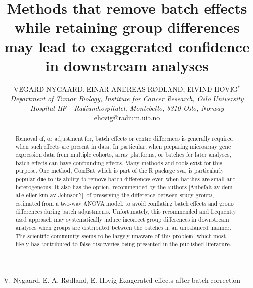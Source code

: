 \documentclass{bio}
\newcommand\NOTE[1]{{\color{red}[#1]}}
\begin{document}
\title{Methods that remove batch effects while retaining group differences may lead
to exaggerated confidence in downstream analyses
}

\author{VEGARD NYGAARD, EINAR ANDREAS RØDLAND, EIVIND HOVIG$^\ast$\\[4pt]
\textit{Department of Tumor Biology,
Institute for Cancer Research,
Oslo University Hospital HF - Radiumhospitalet,
Montebello,
0310 Oslo,
Norway}
\\[2pt]
{ehovig@radium.uio.no}}

\markboth%
{V. Nygaard, E. A. Rødland, E. Hovig}
{Exagerated effects after batch correction}


\maketitle


\begin{abstract}
{Removal of, or adjustment for, batch effects or centre differences is generally required when such effects are present in data. In particular, when preparing microarray gene expression data from multiple cohorts, array platforms, or batches for later analyses, batch effects can have confounding effects. Many methods and tools exist for this purpose. One method, ComBat which is part of the R package sva, is particularly popular due to its ability to remove batch differences even when batches are small and heterogeneous. It also has the option, recommended by the authors \NOTE{Anbefalt av dem alle eller kun av Johnson?}, of preserving the difference between study groups, estimated from a two-way ANOVA model, to avoid conflating batch effects and group differences during batch adjustments. Unfortunately, this recommended and frequently used approach may systematically induce incorrect group differences in downstream analyses when groups are distributed between the batches in an unbalanced manner. The scientific community seems to be largely unaware of this problem, which most likely has contributed to false discoveries being presented in the published literature.
}
\end{abstract}
\end{document}
